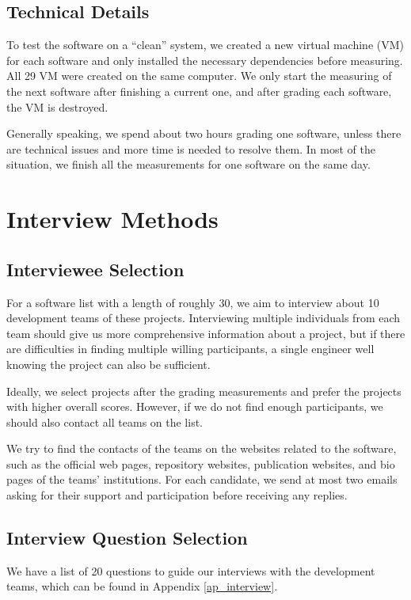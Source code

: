 \subsection{Technical Details}
\label{sec_technical_details}
To test the software on a ``clean'' system, we created a new virtual machine (VM) for each software and only installed the necessary dependencies before measuring. All 29 VM were created on the same computer. We only start the measuring of the next software after finishing a current one, and after grading each software, the VM is destroyed.

Generally speaking, we spend about two hours grading one software, unless there are technical issues and more time is needed to resolve them. In most of the situation, we finish all the measurements for one software on the same day.

\section{Interview Methods}
\label{sec_interview_methods}

\subsection{Interviewee Selection}
For a software list with a length of roughly 30, we aim to interview about 10 development teams of these projects. Interviewing multiple individuals from each team should give us more comprehensive information about a project, but if there are difficulties in finding multiple willing participants, a single engineer well knowing the project can also be sufficient.

Ideally, we select projects after the grading measurements and prefer the projects with higher overall scores. However, if we do not find enough participants, we should also contact all teams on the list.

We try to find the contacts of the teams on the websites related to the software, such as the official web pages, repository websites, publication websites, and bio pages of the teams' institutions. For each candidate, we send at most two emails asking for their support and participation before receiving any replies.

\subsection{Interview Question Selection}

We have a list of 20 questions to guide our interviews with the development teams, which can be found in Appendix \ref{ap_interview}.

